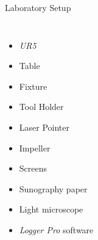 \begin{frame}{Laboratory Setup}
\begin{columns}
    \begin{itemize}
    \Fontvi
        \item \textit{UR5}
        \item Table
        \item Fixture
        \item Tool Holder
        \item Laser Pointer
        \item Impeller
        \item Screens
        \item Sunography paper
        \item Light microscope
        \item \textit{Logger Pro} software

    \end{itemize}
\end{columns}
\end{frame}

